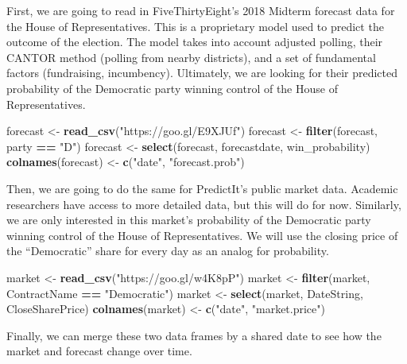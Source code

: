 \documentclass[]{article}
\newenvironment{Shaded}{\begin{snugshade}}{\end{snugshade}}
\newcommand{\KeywordTok}[1]{\textcolor[rgb]{0.13,0.29,0.53}{\textbf{#1}}}
\newcommand{\StringTok}[1]{\textcolor[rgb]{0.31,0.60,0.02}{#1}}
\newcommand{\OperatorTok}[1]{\textcolor[rgb]{0.81,0.36,0.00}{\textbf{#1}}}
\newcommand{\NormalTok}[1]{#1}
\begin{document}
First, we are going to read in FiveThirtyEight's 2018 Midterm forecast
data for the House of Representatives. This is a proprietary model used
to predict the outcome of the election. The model takes into account
adjusted polling, their CANTOR method (polling from nearby districts),
and a set of fundamental factors (fundraising, incumbency). Ultimately,
we are looking for their predicted probability of the Democratic party
winning control of the House of Representatives.

\begin{Shaded}
\begin{Highlighting}[]
\NormalTok{forecast <-}\StringTok{ }\KeywordTok{read_csv}\NormalTok{(}\StringTok{"https://goo.gl/E9XJUf"}\NormalTok{)}
\NormalTok{forecast <-}\StringTok{ }\KeywordTok{filter}\NormalTok{(forecast, party }\OperatorTok{==}\StringTok{ "D"}\NormalTok{)}
\NormalTok{forecast <-}\StringTok{ }\KeywordTok{select}\NormalTok{(forecast, forecastdate, win_probability)}
\KeywordTok{colnames}\NormalTok{(forecast) <-}\StringTok{ }\KeywordTok{c}\NormalTok{(}\StringTok{"date"}\NormalTok{, }\StringTok{"forecast.prob"}\NormalTok{)}
\end{Highlighting}
\end{Shaded}

Then, we are going to do the same for PredictIt's public market data.
Academic researchers have access to more detailed data, but this will do
for now. Similarly, we are only interested in this market's probability
of the Democratic party winning control of the House of Representatives.
We will use the closing price of the ``Democratic'' share for every day
as an analog for probability.

\begin{Shaded}
\begin{Highlighting}[]
\NormalTok{market <-}\StringTok{ }\KeywordTok{read_csv}\NormalTok{(}\StringTok{"https://goo.gl/w4K8pP"}\NormalTok{)}
\NormalTok{market <-}\StringTok{ }\KeywordTok{filter}\NormalTok{(market, ContractName }\OperatorTok{==}\StringTok{ "Democratic"}\NormalTok{)}
\NormalTok{market <-}\StringTok{ }\KeywordTok{select}\NormalTok{(market, DateString, CloseSharePrice)}
\KeywordTok{colnames}\NormalTok{(market) <-}\StringTok{ }\KeywordTok{c}\NormalTok{(}\StringTok{"date"}\NormalTok{, }\StringTok{"market.price"}\NormalTok{)}
\end{Highlighting}
\end{Shaded}

Finally, we can merge these two data frames by a shared date to see how
the market and forecast change over time.
\end{document}

